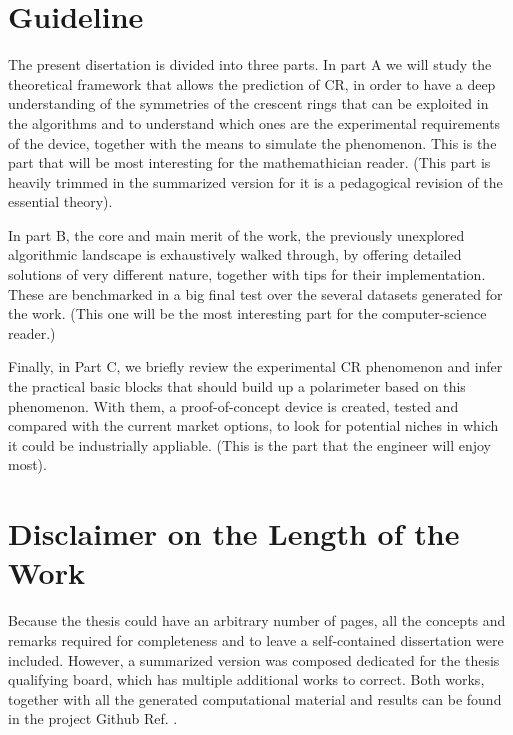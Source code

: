 \documentclass[11pt, a4paper, twoside]{article} %
\begin{document}

\section*{Guideline}\vspace{-0.1cm}
The present disertation is divided into three parts. In part A we will study the theoretical framework that allows the prediction of CR, in order to have a deep understanding of the symmetries of the crescent rings that can be exploited in the algorithms and to understand which ones are the experimental requirements of the device, together with the means to simulate the phenomenon. This is the part that will be most interesting for the mathemathician reader. (This part is heavily trimmed in the summarized version for it is a pedagogical revision of the essential theory).

 In part B, the core and main merit of the work, the previously unexplored algorithmic landscape is exhaustively walked through, by offering detailed solutions of very different nature, together with tips for their implementation. These are benchmarked in a big final test over the several datasets generated for the work. (This one will be the most interesting part for the computer-science reader.)

Finally, in Part C, we briefly review the experimental CR phenomenon and infer the practical basic blocks that should build up a polarimeter based on this phenomenon. With them, a proof-of-concept device is created, tested and compared with the current market options, to look for potential niches in which it could be industrially appliable. (This is the part that the engineer will enjoy most).

\section*{Disclaimer on the Length of the Work\vspace{-0.1cm}}


Because the thesis could have an arbitrary number of pages, all the concepts and remarks required for completeness and to leave a self-contained dissertation were included. However, a summarized version was composed dedicated for the thesis qualifying board, which has multiple additional works to correct. Both works, together with all the generated computational material and results can be found in the project Github Ref. \cite{github}.
\end{document}
